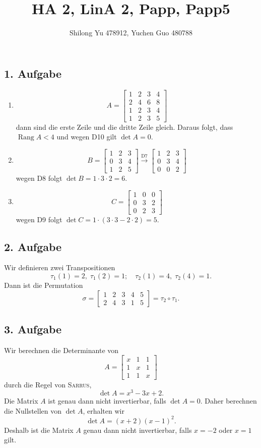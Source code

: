 \documentclass[fleqn,draft,a5paper]{article}
\title{HA 2, LinA 2, Papp, Papp5}
\author{Shilong Yu 478912, Yuchen Guo 480788}
\theoremstyle{remark}
\DeclareMathOperator{\Rang}{Rang}
\begin{document}
\maketitle
\newpage
\subsection{1. Aufgabe}
\begin{enumerate}
\item
  \[
    A = \begin{bmatrix}
      1 & 2 & 3 & 4 \\ 2 & 4 & 6 & 8 \\ 1 & 2 & 3 & 4 \\ 1& 2 & 3 & 5
    \end{bmatrix}
  \]
  dann sind die erste Zeile und die dritte Zeile gleich. Daraus folgt,
  dass \(\Rang A < 4\) und wegen D10 gilt \(\det A = 0\).
\item \[
    B = \begin{bmatrix}
      1 & 2 & 3 \\ 0 & 3 & 4 \\ 1 & 2 & 5
    \end{bmatrix}
    \stackrel{\text{D7}}{\longrightarrow}
    \begin{bmatrix}
      1 & 2 & 3 \\ 0 & 3 & 4 \\ 0 & 0 & 2
    \end{bmatrix}
  \]
  wegen D8 folgt \(\det B = 1 \cdot 3 \cdot 2 = 6\).
\item
  \[C =
    \begin{bmatrix}
      1 & 0 & 0 \\ 0 & 3 & 2 \\ 0 & 2 & 3
    \end{bmatrix}
  \]
  wegen D9 folgt \(\det C = 1 \cdot (3 \cdot 3 - 2 \cdot 2) = 5\).
\end{enumerate}
\subsection{2. Aufgabe}
Wir definieren zwei Transpositionen
\[\tau_{1}(1) = 2, \; \tau_{1}(2) = 1; \quad \tau_{2}(1) = 4, \; \tau_{2}(4) = 1.\]
Dann ist die Permutation
\[\sigma =
  \begin{bmatrix}
    1 & 2 & 3 & 4 & 5 \\ 2 & 4 & 3 & 1 & 5
  \end{bmatrix}
  = \tau_{2} \circ \tau_{1}.
\]
\subsection{3. Aufgabe}
Wir berechnen die Determinante von
\[
  A =
  \begin{bmatrix}
    x & 1 & 1 \\ 1 & x & 1 \\ 1 & 1 & x
  \end{bmatrix}
\]
durch die Regel von \textsc{Sarrus},
\[\det A = x^{3} - 3x + 2.\]
Die Matrix \(A\) ist genau dann nicht invertierbar, falls \(\det A = 0\).
Daher berechnen die Nullstellen von \(\det A\), erhalten wir
\[\det A = (x+2)(x-1)^{2}.\]
Deshalb ist die Matrix \(A\) genau dann nicht invertierbar, falls \(x=-2\)
oder \(x=1\) gilt.
\end{document}
